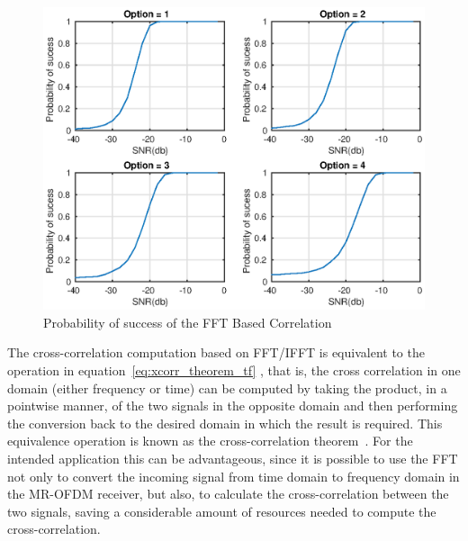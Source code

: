 
 \begin{figure}[hbt]
  \centering
    \includegraphics[width=1\textwidth]
      {./figures/p_sucess_icfo_icfofft_all_opt_awgn1_chan1}
  \caption{Probability of success of the FFT Based Correlation}
  \label{fig:percetange_sucess_fft_based}
\end{figure}
 
 The cross-correlation computation based on FFT/IFFT is equivalent to the operation in equation~\ref{eq:xcorr_theorem_tf} ,  that is, the cross correlation in one domain (either frequency or time) can be computed by taking the product, in a pointwise manner, of the two signals in the opposite domain and then performing the conversion back to the desired domain in which the result is required. This equivalence operation is known as the cross-correlation theorem~\cite{weisstein2002crc}. For the intended application this can be advantageous, since it is possible to use the FFT not only to convert the incoming signal from time domain to frequency domain in the MR-OFDM receiver, but also, to calculate the cross-correlation between the two signals, saving a considerable amount of resources needed to compute the cross-correlation. 

